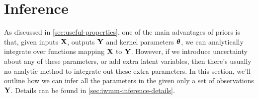 %
%








\section{Inference}
\label{sec:iwmm-inference}

As discussed in \cref{sec:useful-properties}, one of the main advantages of \gp{} priors is that, given inputs $\mathbf{X}$, outputs $\mathbf{Y}$ and kernel parameters ${\boldsymbol{\theta}}$, we can analytically integrate over functions mapping $\mathbf{X}$ to $\mathbf{Y}$.
However, if we introduce uncertainty about any of these parameters, or add extra latent variables, then there's usually no analytic method to integrate out these extra parameters.
In this section, we'll outline how we can infer all the parameters in the \iwmm{} given only a set of observations $\mathbf{Y}$.
Details can be found in \cref{sec:iwmm-inference-details}.

